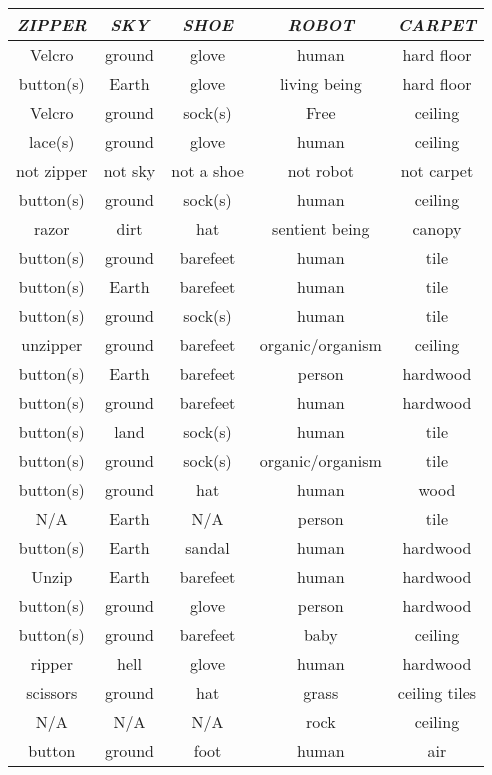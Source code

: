 \begin{table}
	\begin{center}
		\begin{tabular}{|c|c|c|c|c|} \hline
			\textit{ZIPPER} & \textit{SKY} & \textit{SHOE} & \textit{ROBOT} & \textit{CARPET} \\ \hline \hline
			Velcro	&	ground	&	glove	&	human	&	hard floor		\\
			button(s)	&	Earth	&	glove	&	living being	&	hard floor		\\
			Velcro	&	ground	&	sock(s)	&	Free	&	ceiling		\\
			lace(s)	&	ground	&	glove	&	human	&	ceiling		\\
			not zipper	&	not sky	&	not a shoe	&	not robot	&	not carpet		\\
			button(s)	&	ground	&	sock(s)	&	human	&	ceiling		\\
			razor	&	dirt	&	hat	&	sentient being	&	canopy		\\
			button(s)	&	ground	&	barefeet	&	human	&	tile		\\
			button(s)	&	Earth	&	barefeet	&	human	&	tile		\\
			button(s)	&	ground	&	sock(s)	&	human	&	tile		\\
			unzipper	&	ground	&	barefeet	&	organic/organism	&	ceiling		\\
			button(s)	&	Earth	&	barefeet	&	person	&	hardwood		\\
			button(s)	&	ground	&	barefeet	&	human	&	hardwood		\\
			button(s)	&	land	&	sock(s)	&	human	&	tile		\\
			button(s)	&	ground	&	sock(s)	&	organic/organism	&	tile		\\
			button(s)	&	ground	&	hat	&	human	&	wood		\\
			N/A	&	Earth	&	N/A	&	person	&	tile		\\
			button(s)	&	Earth	&	sandal	&	human	&	hardwood		\\
			Unzip	&	Earth	&	barefeet	&	human	&	hardwood		\\
			button(s)	&	ground	&	glove	&	person	&	hardwood		\\
			button(s)	&	ground	&	barefeet	&	baby	&	ceiling		\\
			ripper	&	hell	&	glove	&	human	&	hardwood		\\
			scissors	&	ground	&	hat	&	grass	&	ceiling tiles		\\
			N/A	&	N/A	&	N/A	&	rock	&	ceiling		\\
			button	&	ground	&	foot	&	human	&	air		\\

\end{tabular}
\end{center}
\end{table}
